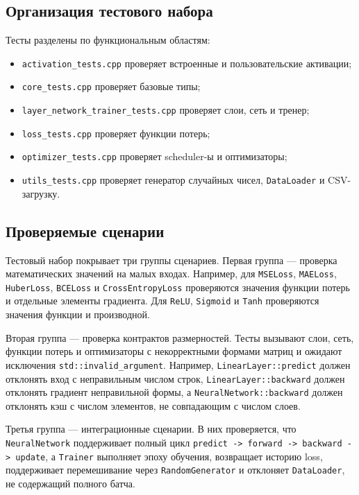 \documentclass{article}
\begin{document}
\subsection{Организация тестового набора}

Тесты разделены по функциональным областям:
\begin{itemize}
    \item \texttt{activation\_tests.cpp} проверяет встроенные и
        пользовательские активации; \item \texttt{core\_tests.cpp}
        проверяет базовые типы; \item
        \texttt{layer\_network\_trainer\_tests.cpp} проверяет слои,
        сеть и тренер; \item \texttt{loss\_tests.cpp} проверяет
        функции потерь; \item \texttt{optimizer\_tests.cpp} проверяет
        scheduler-ы и оптимизаторы; \item \texttt{utils\_tests.cpp}
        проверяет генератор случайных чисел, \texttt{DataLoader} и
        CSV-загрузку.
\end{itemize}

\subsection{Проверяемые сценарии}

Тестовый набор покрывает три группы сценариев. Первая группа ---
проверка математических значений на малых входах. Например, для
\texttt{MSELoss}, \texttt{MAELoss}, \texttt{HuberLoss},
\texttt{BCELoss} и \texttt{CrossEntropyLoss} проверяются значения
функции потерь и отдельные элементы градиента. Для \texttt{ReLU},
\texttt{Sigmoid} и \texttt{Tanh} проверяются значения функции и
производной.

Вторая группа --- проверка контрактов размерностей. Тесты вызывают
слои, сеть, функции потерь и оптимизаторы с некорректными формами
матриц и ожидают исключения \texttt{std::invalid\_argument}. Например,
\texttt{LinearLayer::predict} должен отклонять вход с неправильным
числом строк, \texttt{LinearLayer::backward} должен отклонять градиент
неправильной формы, а \texttt{NeuralNetwork::backward} должен
отклонять кэш с числом элементов, не совпадающим с числом слоев.

Третья группа --- интеграционные сценарии. В них проверяется, что
\texttt{NeuralNetwork} поддерживает полный цикл \texttt{predict ->
forward -> backward -> update}, а \texttt{Trainer} выполняет эпоху
обучения, возвращает историю loss, поддерживает перемешивание через
\texttt{RandomGenerator} и отклоняет \texttt{DataLoader}, не
содержащий полного батча.
\end{document}
